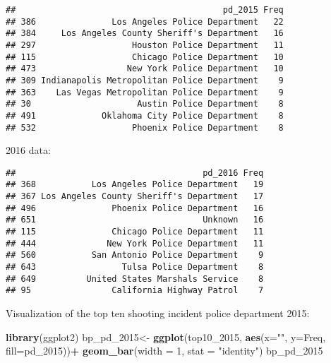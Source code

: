 \documentclass[
]{article}
\newenvironment{Shaded}{\begin{snugshade}}{\end{snugshade}}
\newcommand{\DataTypeTok}[1]{\textcolor[rgb]{0.13,0.29,0.53}{#1}}
\newcommand{\DecValTok}[1]{\textcolor[rgb]{0.00,0.00,0.81}{#1}}
\newcommand{\KeywordTok}[1]{\textcolor[rgb]{0.13,0.29,0.53}{\textbf{#1}}}
\newcommand{\NormalTok}[1]{#1}
\newcommand{\OperatorTok}[1]{\textcolor[rgb]{0.81,0.36,0.00}{\textbf{#1}}}
\newcommand{\StringTok}[1]{\textcolor[rgb]{0.31,0.60,0.02}{#1}}
\begin{document}
\begin{verbatim}
##                                         pd_2015 Freq
## 386               Los Angeles Police Department   22
## 384     Los Angeles County Sheriff's Department   16
## 297                   Houston Police Department   11
## 115                   Chicago Police Department   10
## 473                  New York Police Department   10
## 309 Indianapolis Metropolitan Police Department    9
## 363    Las Vegas Metropolitan Police Department    9
## 30                     Austin Police Department    8
## 491             Oklahoma City Police Department    8
## 532                   Phoenix Police Department    8
\end{verbatim}

2016 data:

\begin{Shaded}
\end{Shaded}

\begin{verbatim}
##                                     pd_2016 Freq
## 368           Los Angeles Police Department   19
## 367 Los Angeles County Sheriff's Department   17
## 496               Phoenix Police Department   16
## 651                                 Unknown   16
## 115               Chicago Police Department   11
## 444              New York Police Department   11
## 560           San Antonio Police Department    9
## 643                 Tulsa Police Department    8
## 649          United States Marshals Service    8
## 95                California Highway Patrol    7
\end{verbatim}

Visualization of the top ten shooting incident police department 2015:

\begin{Shaded}
\begin{Highlighting}[]
\KeywordTok{library}\NormalTok{(ggplot2)}
\NormalTok{bp_pd_}\DecValTok{2015}\NormalTok{<-}\StringTok{ }\KeywordTok{ggplot}\NormalTok{(top10_}\DecValTok{2015}\NormalTok{, }\KeywordTok{aes}\NormalTok{(}\DataTypeTok{x=}\StringTok{""}\NormalTok{, }\DataTypeTok{y=}\NormalTok{Freq, }\DataTypeTok{fill=}\NormalTok{pd_}\DecValTok{2015}\NormalTok{))}\OperatorTok{+}
\KeywordTok{geom_bar}\NormalTok{(}\DataTypeTok{width =} \DecValTok{1}\NormalTok{, }\DataTypeTok{stat =} \StringTok{"identity"}\NormalTok{)}
\NormalTok{bp_pd_}\DecValTok{2015}
\end{Highlighting}
\end{Shaded}
\end{document}
